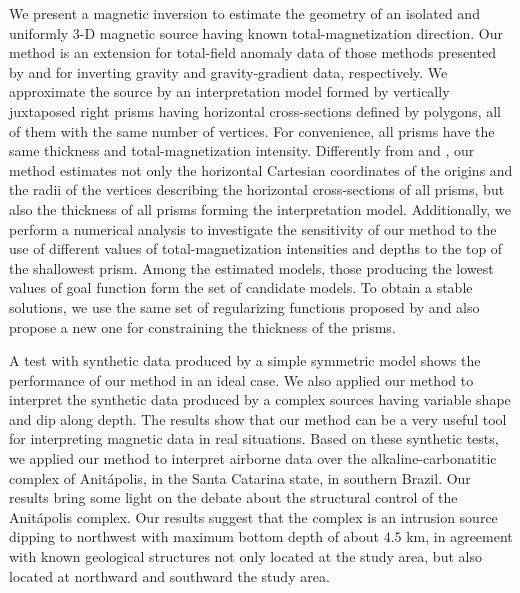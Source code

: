 We present a magnetic inversion to estimate the geometry of an isolated 
and uniformly 3-D magnetic source having known total-magnetization direction.
Our method is an extension for total-field anomaly data of those methods presented 
by \cite{oliveirajr-etal2011} and \cite{oliveirajr-barbosa2013} for inverting 
gravity and gravity-gradient data, respectively. 
We approximate the source by an interpretation model formed by vertically juxtaposed 
right prisms having horizontal cross-sections defined by polygons, all
of them with the same number of vertices.
For convenience, all prisms have the same thickness and total-magnetization 
intensity.
Differently from \cite{oliveirajr-etal2011} and \cite{oliveirajr-barbosa2013}, 
our method estimates not only the horizontal Cartesian coordinates of the origins and the radii of the vertices describing the horizontal cross-sections of all prisms, but also the thickness of all 
prisms forming the interpretation model. Additionally, we perform a numerical analysis to investigate the sensitivity of our method to the use of different values of total-magnetization intensities and depths to the top 
of the shallowest prism. Among the estimated models, those producing the 
lowest values of goal function form the set of candidate models.
To obtain a stable solutions, we use the same set of regularizing functions proposed by 
\cite{oliveirajr-etal2011} and also propose a new one for constraining the 
thickness of the prisms. 

A test with synthetic data produced by a simple symmetric model shows the performance 
of our method in an ideal case. We also applied our method to interpret the synthetic 
data produced by a complex sources having variable shape and dip along depth. The 
results show that our method can be a very useful tool for interpreting magnetic data 
in real situations. Based on these synthetic tests, we applied our method 
to interpret airborne data over the alkaline-carbonatitic complex of 
Anit{\'a}polis, in the Santa Catarina state, in southern Brazil. Our results bring some light 
on the debate about the structural control of the Anit{\'a}polis complex. 
Our results suggest that the complex is an intrusion source dipping to northwest with maximum bottom depth of about $ 4.5 $ km, in agreement 
with known geological structures not only located at the study area, but also located at northward and southward 
the study area.